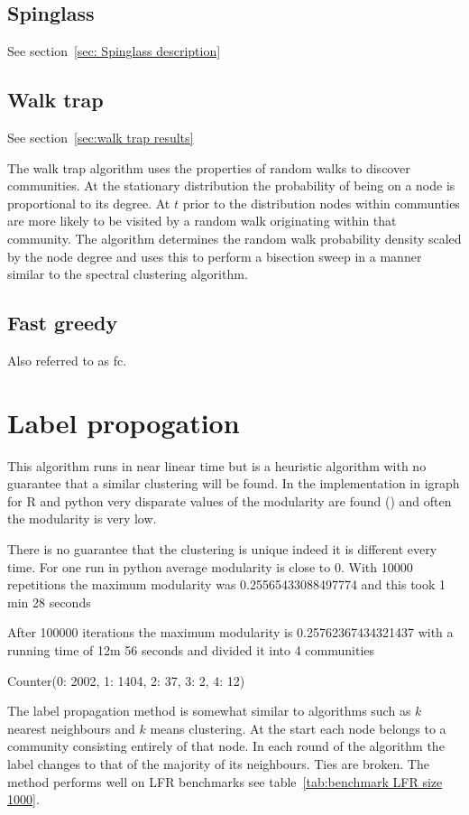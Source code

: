 \subsection{Spinglass}
See section~\ref{sec: Spinglass description}

\subsection{Walk trap}
See section~\ref{sec:walk trap results}

The walk trap algorithm uses the properties of random walks to discover communities. At the stationary distribution the probability of being on a node is proportional to its degree. At $t$ prior to the distribution nodes within communties are more likely to be visited by a random walk originating within that community. The algorithm determines the random walk probability density scaled by the node degree and uses this to perform a bisection sweep in a manner similar to the spectral clustering algorithm.

\cite{pons2005computing}
\subsection{Fast greedy}
Also referred to as fc.
\cite{clauset2004finding}

\section{Label propogation}
\label{sec:label propogation}
This algorithm runs in near linear time but is a heuristic algorithm with no guarantee that a similar clustering will be found. In the implementation in igraph for R and python very disparate values of the modularity are found () and often the modularity is very low. 
\cite{raghavan2007near}

There is no guarantee that the clustering is unique indeed it is different every time. For one run in python average modularity is close to 0. With 10000 repetitions the maximum modularity was 0.25565433088497774 and this took 1 min 28 seconds

After 100000 iterations the maximum modularity is 0.25762367434321437 with a running time of 12m 56 seconds and divided it into 4 communities

Counter(0: 2002, 1: 1404, 2: 37, 3: 2, 4: 12)

The label propagation method is somewhat similar to algorithms such as $k$ nearest neighbours and $k$ means clustering. At the start each node belongs to a community consisting entirely of that node. In each round of the algorithm the label changes to that of the majority of its neighbours. Ties are broken. The method performs well on LFR benchmarks see table~\ref{tab:benchmark LFR size 1000}.


